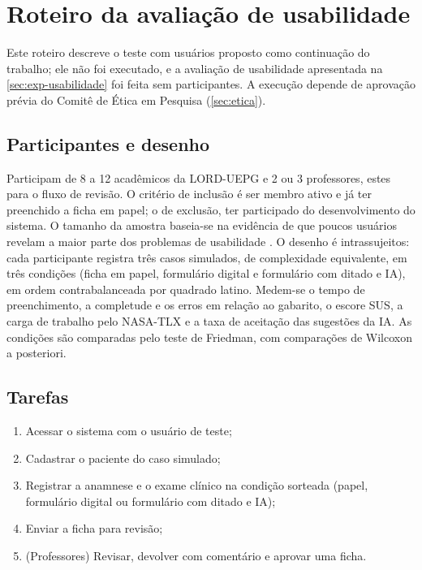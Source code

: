 \chapter{Roteiro da avaliação de usabilidade}
\label{apendice:usabilidade}

Este roteiro descreve o teste com usuários proposto como continuação do trabalho; ele não foi executado, e a avaliação de usabilidade apresentada na \autoref{sec:exp-usabilidade} foi feita sem participantes. A execução depende de aprovação prévia do Comitê de Ética em Pesquisa (\autoref{sec:etica}).

\section{Participantes e desenho}

Participam de 8 a 12 acadêmicos da LORD-UEPG e 2 ou 3 professores, estes para o fluxo de revisão. O critério de inclusão é ser membro ativo e já ter preenchido a ficha em papel; o de exclusão, ter participado do desenvolvimento do sistema. O tamanho da amostra baseia-se na evidência de que poucos usuários revelam a maior parte dos problemas de usabilidade \cite{nielsen1993}. O desenho é intrassujeitos: cada participante registra três casos simulados, de complexidade equivalente, em três condições (ficha em papel, formulário digital e formulário com ditado e IA), em ordem contrabalanceada por quadrado latino. Medem-se o tempo de preenchimento, a completude e os erros em relação ao gabarito, o escore SUS, a carga de trabalho pelo NASA-TLX \cite{hart1988} e a taxa de aceitação das sugestões da IA. As condições são comparadas pelo teste de Friedman, com comparações de Wilcoxon a posteriori.

\section{Tarefas}

\begin{enumerate}
	\item Acessar o sistema com o usuário de teste;
	\item Cadastrar o paciente do caso simulado;
	\item Registrar a anamnese e o exame clínico na condição sorteada (papel, formulário digital ou formulário com ditado e IA);
	\item Enviar a ficha para revisão;
	\item (Professores) Revisar, devolver com comentário e aprovar uma ficha.
\end{enumerate}

